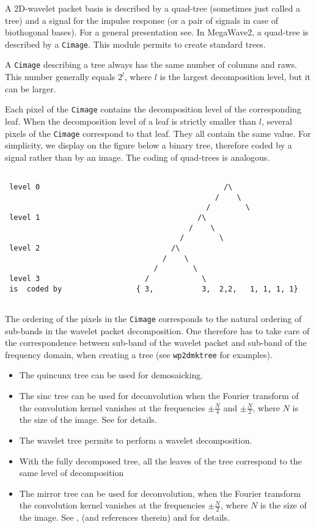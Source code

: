 A 2D-wavelet packet basis is described by a quad-tree (sometimes just called
a tree) and a signal for the impulse response (or a pair of signals in case
of biothogonal bases). For a general presentation see\cite{mallat:wavelet}. 
In MegaWave2, a quad-tree is described by a \verb+Cimage+. 
This module permits to create standard trees. 

A \verb+Cimage+ describing a tree always has the same number of columns
and raws. This number generally equals $2^l$, where $l$ is the largest
decomposition level, but it can be larger.

Each pixel of the \verb+Cimage+ contains the decomposition level of the
corresponding leaf. When the decomposition level of a leaf is strictly
smaller than $l$, several pixels of the \verb+Cimage+ correspond to that
leaf. They all contain the same value. For simplicity, we display on the
figure below a binary tree, therefore coded by a signal rather than by an
image. The coding of quad-trees is analogous. 

\begin{verbatim}

 level 0                                          /\
                                                /    \
                                              /        \
 level 1                                    /\
                                          /    \
                                        /        \
 level 2                              /\
                                    /    \                                        
                                  /        \
 level 3                        /            \
 is  coded by                 { 3,           3,  2,2,   1, 1, 1, 1}
                       
\end{verbatim}

The ordering of the pixels in the \verb+Cimage+ corresponds to the
natural ordering of sub-bands in the wavelet packet decomposition.
One therefore has to take care of the correspondence between sub-band
of the wavelet packet and sub-band of the frequency domain, when
creating a tree (see \verb+wp2dmktree+ for examples).

\begin{itemize}
\item The quincunx tree can be used for demosaicking.
\item The sinc tree can be used for deconvolution when the Fourier transform
of the convolution kernel vanishes at the frequencies $\pm
\frac{N}{4}$ and $\pm \frac{N}{2}$, where $N$ is the size of the
image. See \cite{malgouyres:framework} for details.
\item The wavelet tree permits to perform a wavelet decomposition.
\item With the fully decomposed tree, all the leaves of the tree
  correspond to the same level of decomposition
\item The mirror tree can be used for deconvolution, when the Fourier
  transform the convolution kernel vanishes at the frequencies  $\pm
  \frac{N}{2}$, where $N$ is the size of the image. See
  \cite{kalifa.mallat.ea:image}, \cite{mallat:wavelet} (and references therein) and
  \cite{malgouyres:framework} for details.
\end{itemize}